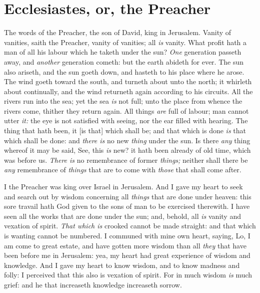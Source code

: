 \documentclass[11pt,letterpaper,oneside]{memoir}
\begin{document}
\chapter[Ecclesiastes]{Ecclesiastes, or, the Preacher}

The words of the Preacher, the son of David, king in Jerusalem. Vanity 
of vanities, saith the Preacher, vanity of vanities; all \emph{is} 
vanity. What profit hath a man of all his labour which he taketh under 
the sun? \emph{One} generation passeth away, and \emph{another} 
generation cometh: but the earth abideth for ever. The sun also ariseth, 
and the sun goeth down, and hasteth to his place where he arose. The 
wind goeth toward the south, and turneth about unto the north; it 
whirleth about continually, and the wind returneth again according to 
his circuits. All the rivers run into the sea; yet the sea \emph{is} not 
full; unto the place from whence the rivers come, thither they return 
again. All things \emph{are} full of labour; man cannot utter \emph{it:} 
the eye is not satisfied with seeing, nor the ear filled with hearing. 
The thing that hath been, it [is that] which shall be; and that which is 
done \emph{is} that which shall be done: and \emph{there is} no new 
\emph{thing} under the sun. Is there \emph{any} thing whereof it may be 
said, See, this \emph{is} new? it hath been already of old time, which 
was before us. \emph{There is} no remembrance of former \emph{things;} 
neither shall there be \emph{any} remembrance of \emph{things} that are 
to come with \emph{those} that shall come after. 

I the Preacher was king over Israel in Jerusalem. And I gave my heart to 
seek and search out by wisdom concerning all \emph{things} that are done 
under heaven: this sore travail hath God given to the sons of man to be 
exercised therewith. I have seen all the works that are done under the 
sun; and, behold, all \emph{is} vanity and vexation of spirit. 
\emph{That which is} crooked cannot be made straight: and that which is 
wanting cannot be numbered. I communed with mine own heart, saying, Lo, 
I am come to great estate, and have gotten more wisdom than all 
\emph{they} that have been before me in Jerusalem: yea, my heart had 
great experience of wisdom and knowledge. And I gave my heart to know 
wisdom, and to know madness and folly: I perceived that this also is 
vexation of spirit. For in much wisdom \emph{is} much grief: and he that 
increaseth knowledge increaseth sorrow. 
\end{document}
